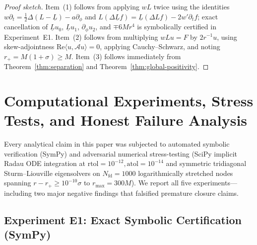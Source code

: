 \documentclass[11pt, a4paper]{article}
\theoremstyle{remark}
\begin{document}
\begin{proof}[Proof sketch]
Item~(1) follows from applying $wL$ twice using the identities $w\partial_t = \frac{1}{2}\Delta(L - \underline{L}) - a\partial_\phi$ and $L(\Delta\underline{L} f) = \underline{L}(\Delta L f) - 2w'\partial_t f$; exact cancellation of $\underline{L}u_0$, $\underline{L}u_1$, $\partial_\phi u_2$, and $\mp 6Mr^4$ is symbolically certified in Experiment~E1. Item~(2) follows from multiplying $w L u = F$ by $2r^{-1}u$, using skew-adjointness $\mathrm{Re}\langle u, \mathcal{A} u\rangle = 0$, applying Cauchy--Schwarz, and noting $r_+ = M(1+\sigma) \ge M$. Item~(3) follows immediately from Theorem~\ref{thm:separation} and Theorem~\ref{thm:global-positivity}.
\end{proof}

\section{Computational Experiments, Stress Tests, and Honest Failure Analysis}
\label{sec:experiments}

Every analytical claim in this paper was subjected to automated symbolic verification (SymPy) and adversarial numerical stress-testing (SciPy implicit Radau ODE integration at $\mathrm{rtol}=10^{-12}, \mathrm{atol}=10^{-14}$ and symmetric tridiagonal Sturm--Liouville eigensolvers on $N_{\mathrm{fd}} = 1000$ logarithmically stretched nodes spanning $r - r_+ \ge 10^{-10}\sigma$ to $r_{\max} = 300M$). We report all five experiments---including two major negative findings that falsified premature closure claims.

\subsection{Experiment E1: Exact Symbolic Certification (SymPy)}
\end{document}
